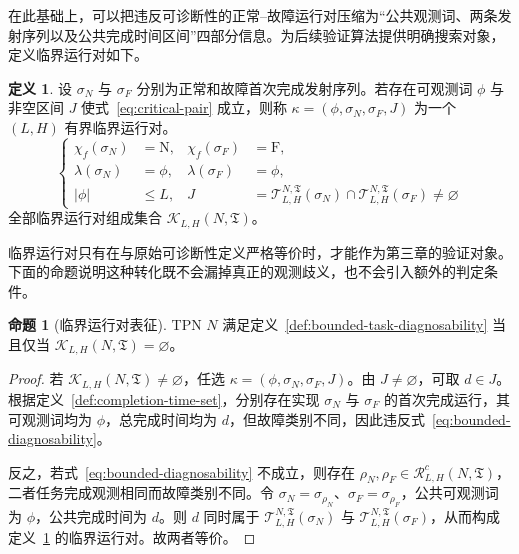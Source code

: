 \documentclass[master,fontset=ubuntu]{shnuthesis}
\theoremstyle{definition}
\newtheorem{thesisdefinition}{定义}
\newtheorem{thesisproposition}{命题}
\begin{document}
在此基础上，可以把违反可诊断性的正常--故障运行对压缩为“公共观测词、两条发射序列以及公共完成时间区间”四部分信息。为后续验证算法提供明确搜索对象，定义临界运行对如下。

\begin{thesisdefinition}
\label{def:critical-pair}
设 \(\sigma_N\) 与 \(\sigma_F\) 分别为正常和故障首次完成发射序列。若存在可观测词 \(\phi\) 与非空区间 \(J\) 使式~\eqref{eq:critical-pair} 成立，则称 \(\kappa=(\phi,\sigma_N,\sigma_F,J)\) 为一个 \((L,H)\) 有界临界运行对。
\begin{equation}
\left\{
\begin{aligned}
\chi_f(\sigma_N)&=\mathrm N,
&\chi_f(\sigma_F)&=\mathrm F,\\
\lambda(\sigma_N)&=\phi,
&\lambda(\sigma_F)&=\phi,\\
|\phi|&\leq L,
&J&=
\mathcal T_{L,H}^{N,\mathfrak T}(\sigma_N)\cap
\mathcal T_{L,H}^{N,\mathfrak T}(\sigma_F)\neq\varnothing
\end{aligned}
\right.
\label{eq:critical-pair}
\end{equation}
全部临界运行对组成集合 \(\mathcal K_{L,H}(N,\mathfrak T)\)。
\end{thesisdefinition}

临界运行对只有在与原始可诊断性定义严格等价时，才能作为第三章的验证对象。下面的命题说明这种转化既不会漏掉真正的观测歧义，也不会引入额外的判定条件。

\begin{thesisproposition}[临界运行对表征]
\label{prop:critical-pair-characterization}
TPN \(N\) 满足定义~\ref{def:bounded-task-diagnosability} 当且仅当 \(\mathcal K_{L,H}(N,\mathfrak T)=\varnothing\)。
\end{thesisproposition}

\begin{proof}
若 \(\mathcal K_{L,H}(N,\mathfrak T)\neq\varnothing\)，任选 \(\kappa=(\phi,\sigma_N,\sigma_F,J)\)。由 \(J\neq\varnothing\)，可取 \(d\in J\)。根据定义~\ref{def:completion-time-set}，分别存在实现 \(\sigma_N\) 与 \(\sigma_F\) 的首次完成运行，其可观测词均为 \(\phi\)，总完成时间均为 \(d\)，但故障类别不同，因此违反式~\eqref{eq:bounded-diagnosability}。

反之，若式~\eqref{eq:bounded-diagnosability} 不成立，则存在 \(\rho_N,\rho_F\in\mathcal R^c_{L,H}(N,\mathfrak T)\)，二者任务完成观测相同而故障类别不同。令 \(\sigma_N=\sigma_{\rho_N}\)、\(\sigma_F=\sigma_{\rho_F}\)，公共可观测词为 \(\phi\)，公共完成时间为 \(d\)。则 \(d\) 同时属于 \(\mathcal T_{L,H}^{N,\mathfrak T}(\sigma_N)\) 与 \(\mathcal T_{L,H}^{N,\mathfrak T}(\sigma_F)\)，从而构成定义~\ref{def:critical-pair} 的临界运行对。故两者等价。
\end{proof}
\end{document}
